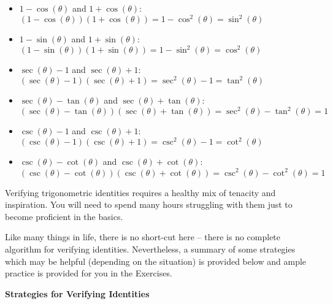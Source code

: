 \documentclass{ximera}
\begin{document}
\begin{itemize}

\item $1 - \cos(\theta)$ and  $1+\cos(\theta)$:  $(1-\cos(\theta))(1+\cos(\theta)) = 1 - \cos^{2}(\theta) = \sin^{2}(\theta)$

\item  $1-\sin(\theta)$ and $1 + \sin(\theta)$:  $(1-\sin(\theta))(1+\sin(\theta)) = 1 - \sin^{2}(\theta) = \cos^{2}(\theta)$

\item  $\sec(\theta)-1$ and $\sec(\theta)+1$:  $(\sec(\theta)-1)(\sec(\theta)+1) = \sec^{2}(\theta) - 1 =  \tan^{2}(\theta)$

\item  $\sec(\theta)-\tan(\theta)$ and $\sec(\theta)+\tan(\theta)$:  $(\sec(\theta)-\tan(\theta))(\sec(\theta)+\tan(\theta)) = \sec^{2}(\theta) - \tan^{2}(\theta) = 1$

\item  $\csc(\theta)-1$ and $\csc(\theta)+1$:  $(\csc(\theta)-1)(\csc(\theta)+1) = \csc^{2}(\theta) - 1 =  \cot^{2}(\theta)$

\item  $\csc(\theta)-\cot(\theta)$ and $\csc(\theta)+\cot(\theta)$:  $(\csc(\theta)-\cot(\theta))(\csc(\theta)+\cot(\theta)) = \csc^{2}(\theta) - \cot^{2}(\theta) = 1$

\smallskip

\end{itemize}



\smallskip

Verifying trigonometric identities requires a healthy mix of tenacity and inspiration.  You will need to spend many hours struggling with them just to become proficient in the basics. 

\smallskip

 Like many things in life, there is no short-cut here -- there is no complete algorithm for verifying identities.  Nevertheless, a summary of some strategies which  may be helpful (depending on the situation) is provided below and ample practice is provided for you in the Exercises.
 
 \smallskip

\label{IdentityHelp}


\medskip

\centerline{\textbf{Strategies for Verifying Identities}} 
\end{document}

